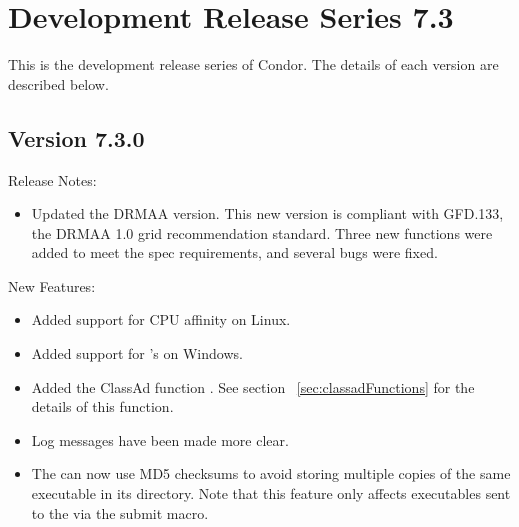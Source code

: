 
\section{\label{sec:History-7-3}Development Release Series 7.3}

This is the development release series of Condor.
The details of each version are described below.


\subsection*{\label{sec:New-7-3-0}Version 7.3.0}

\noindent Release Notes:

\begin{itemize}

\item Updated the DRMAA version.  This new version is compliant with GFD.133, the DRMAA 1.0 grid recommendation standard.  Three new functions were added to meet the spec requirements, and several bugs were fixed.

\end{itemize}


\noindent New Features:

\begin{itemize}

\item Added support for CPU affinity on Linux.

\item Added support for 's  on Windows.

\item Added the ClassAd function .
See section~ \ref{sec:classadFunctions} for the details of this function.

\item Log messages have been made more clear.

\item The  can now use MD5 checksums to avoid storing
multiple copies of the same executable in its  directory.
Note that this feature only affects executables sent to the
 via the  submit macro.

\end{itemize}


